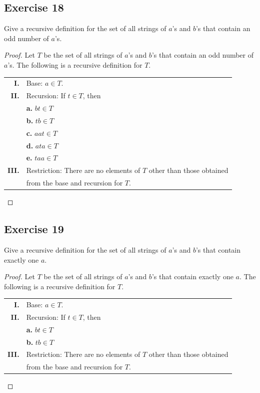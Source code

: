 \documentclass[14pt]{extarticle}
\begin{document}
\subsection{Exercise 18}
Give a recursive definition for the set of all strings of $a$’s and $b$’s that contain an odd number of $a$’s.

\begin{proof}
Let $T$ be the set of all strings of $a$’s and $b$’s that contain an odd number of $a$’s.
The following is a recursive definition for $T$.

\begin{tabular}{rl}
{\bf I.}  & Base: $a \in T$. \\
{\bf II.} & Recursion: If $t \in T$, then \\
& {\bf a.} $bt \in T$ \\
& {\bf b.} $tb \in T$ \\
& {\bf c.} $aat \in T$ \\
& {\bf d.} $ata \in T$ \\
& {\bf e.} $taa \in T$ \\
{\bf III.} & Restriction: There are no elements of $T$ other than those obtained \\
& from the base and recursion for $T$.
\end{tabular}
\end{proof}

\subsection{Exercise 19}
Give a recursive definition for the set of all strings of $a$’s and $b$’s that contain exactly one $a$.

\begin{proof}
Let $T$ be the set of all strings of $a$’s and $b$’s that contain exactly one $a$.
The following is a recursive definition for $T$.

\begin{tabular}{rl}
{\bf I.}  & Base: $a \in T$. \\
{\bf II.} & Recursion: If $t \in T$, then \\
& {\bf a.} $bt \in T$ \\
& {\bf b.} $tb \in T$ \\
{\bf III.} & Restriction: There are no elements of $T$ other than those obtained \\
& from the base and recursion for $T$.
\end{tabular}
\end{proof}
\end{document}
